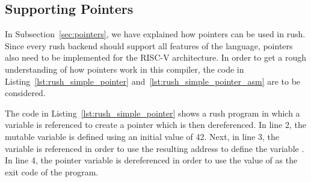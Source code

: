 \subsection{Supporting Pointers}

In Subsection~\ref{sec:pointers}, we have explained how pointers can be used in rush.
Since every rush backend should support all features of the language, pointers also need to be implemented for the RISC-V architecture.
In order to get a rough understanding of how pointers work in this compiler, the code in Listing~\ref{lst:rush_simple_pointer} and~\ref{lst:rush_simple_pointer_asm} are to be considered.

\begin{minipage}{.34\textwidth}
	\center
\end{minipage}%
\hspace{3cm}
\begin{minipage}{.45\textwidth}
	\center
\end{minipage}


The code in Listing~\ref{lst:rush_simple_pointer} shows a rush program in which a variable is referenced to create a pointer which is then dereferenced.
In line 2, the mutable variable  is defined using an initial value of 42.
Next, in line 3, the variable is referenced in order to use the resulting address to define the variable .
In line 4, the  pointer variable is dereferenced in order to use the value of  as the exit code of the program.


